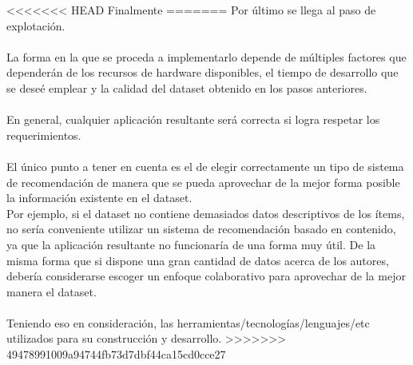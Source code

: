 <<<<<<< HEAD
 Finalmente 
=======
\noindent Por último se llega al paso de explotación. 
\\\\
La forma en la que se proceda a implementarlo depende de múltiples factores que dependerán 
de los recursos de hardware disponibles, el tiempo de desarrollo que se deseé emplear y 
la calidad del dataset obtenido en los pasos anteriores.
\\\\
En general, cualquier aplicación resultante será correcta si logra respetar los requerimientos.
\\\\
El único punto a tener en cuenta es el de elegir correctamente un tipo de sistema de recomendación 
de manera que se pueda aprovechar de la mejor forma posible la información existente en el dataset. \\
Por ejemplo, si el dataset no contiene demasiados datos descriptivos de los ítems, no sería 
conveniente utilizar un sistema de recomendación basado en contenido, ya que la aplicación resultante 
no funcionaría de una forma muy útil.
De la misma forma que si dispone una gran cantidad de datos acerca de los autores, debería considerarse 
escoger un enfoque colaborativo para aprovechar de la mejor manera el dataset.
\\
\\
Teniendo eso en consideración, las herramientas/tecnologías/lenguajes/etc utilizados para su 
construcción y desarrollo.
>>>>>>> 49478991009a94744fb73d7dbf44ca15cd0cce27

